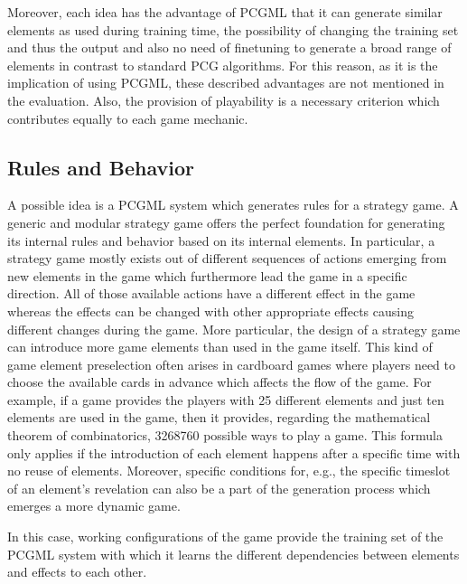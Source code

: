 \documentclass[MGS,Master,english]{twbook}%
\begin{document}
Moreover, each idea has the advantage of PCGML that it can generate similar elements as used during training time, the possibility of changing the training set and thus the output and also no need of finetuning to generate a broad range of elements in contrast to standard PCG algorithms. For this reason, as it is the implication of using PCGML, these described advantages are not mentioned in the evaluation. Also, the provision of playability is a necessary criterion which contributes equally to each game mechanic.

\subsection{Rules and Behavior} \label{idea::rulesAndBehavior}
A possible idea is a PCGML system which generates rules for a strategy game. A generic and modular strategy game offers the perfect foundation for generating its internal rules and behavior based on its internal elements. In particular, a strategy game mostly exists out of different sequences of actions emerging from new elements in the game which furthermore lead the game in a specific direction. All of those available actions have a different effect in the game whereas the effects can be changed with other appropriate effects causing different changes during the game. More particular, the design of a strategy game can introduce more game elements than used in the game itself. This kind of game element preselection often arises in cardboard games where players need to choose the available cards in advance which affects the flow of the game. For example, if a game provides the players with 25 different elements and just ten elements are used in the game, then it provides, regarding the mathematical theorem of combinatorics, 3268760 possible ways to play a game. This formula only applies if the introduction of each element happens after a specific time with no reuse of elements. Moreover, specific conditions for, e.g., the specific timeslot of an element's revelation can also be a part of the generation process which emerges a more dynamic game.

In this case, working configurations of the game provide the training set of the PCGML system with which it learns the different dependencies between elements and effects to each other. 
\end{document}
